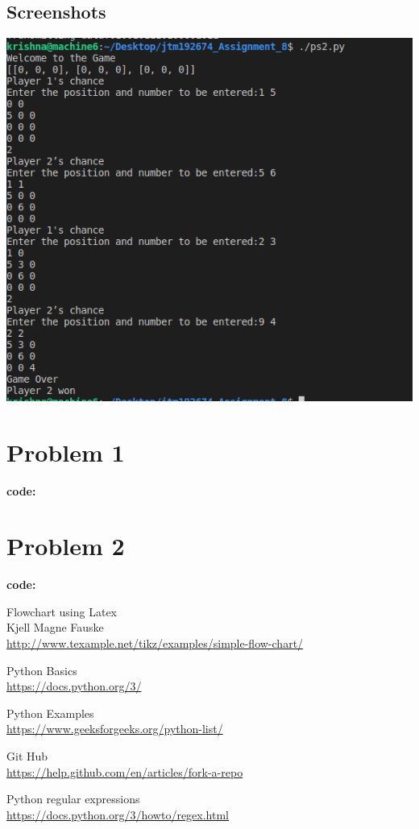 \documentclass[12pt]{article}
\begin{document}
\subsection{Screenshots}
\includegraphics[width=\linewidth]{lab8_2.png}

 \appendix
   \appendixpage
   \addappheadtotoc
  \section*{Problem 1}
  {\large \textbf{code:}}
  
  \section*{Problem 2}
  {\large \textbf{code:}}
  
  
  
\newpage
\begin{thebibliography}{11}
Flowchart using Latex\\
Kjell Magne Fauske \\
\url{http://www.texample.net/tikz/examples/simple-flow-chart/}

Python Basics \\
\url{https://docs.python.org/3/}

Python Examples\\
\url{https://www.geeksforgeeks.org/python-list/}

Git Hub\\
\url{https://help.github.com/en/articles/fork-a-repo}

Python regular expressions\\
\url{https://docs.python.org/3/howto/regex.html}

\end{thebibliography}


  
   
   
\end{document}
